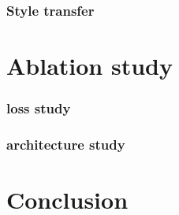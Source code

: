 \documentclass[10pt,twocolumn,letterpaper]{article}
\begin{document}
\subsubsection{Style transfer}

\section{Ablation study}
\subsubsection{loss study}
\subsubsection{architecture study}


\section{Conclusion}


{\small


}
\end{document}
